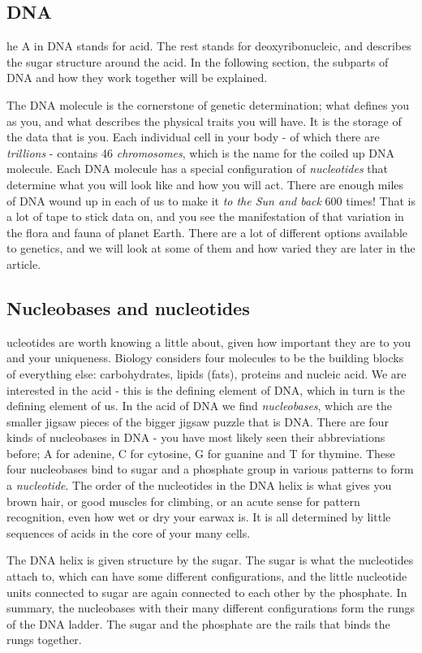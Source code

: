 \subsection*{DNA}
he A in DNA stands for acid.
The rest stands for deoxyribonucleic, and describes the sugar structure around the acid. In the following section, the subparts of DNA and how they work together will be explained. 

The DNA molecule is the cornerstone of genetic determination; what defines you as you, and what describes the physical traits you will have.
It is the storage of the data that is you.
Each individual cell in your body - of which there are \emph{trillions} - contains 46 \emph{chromosomes}, which is the name for the coiled up DNA molecule.
Each DNA molecule has a special configuration of \emph{nucleotides} that determine what you will look like and how you will act.
There are enough miles of DNA wound up in each of us to make it \emph{to the Sun and back} 600 times!
That is a lot of tape to stick data on, and you see the manifestation of that variation in the flora and fauna of planet Earth.
There are a lot of different options available to genetics, and we will look at some of them and how varied they are later in the article.

\subsection*{Nucleobases and nucleotides}
ucleotides are worth knowing a little about, given how important they are to you and your uniqueness.
Biology considers four molecules to be the building blocks of everything else: carbohydrates, lipids (fats), proteins and nucleic acid.
We are interested in the acid - this is the defining element of DNA, which in turn is the defining element of us.
In the acid of DNA we find \emph{nucleobases}, which are the smaller jigsaw pieces of the bigger jigsaw puzzle that is DNA.
There are four kinds of nucleobases in DNA - you have most likely seen their abbreviations before; A for adenine, C for cytosine, G for guanine and T for thymine.
These four nucleobases bind to sugar and a phosphate group in various patterns to form a \emph{nucleotide}.
The order of the nucleotides in the DNA helix is what gives you brown hair, or good muscles for climbing, or an acute sense for pattern recognition, even how wet or dry your earwax is.
It is all determined by little sequences of acids in the core of your many cells.

The DNA helix is given structure by the sugar.
The sugar is what the nucleotides attach to, which can have some different configurations, and the little nucleotide units connected to sugar are again connected to each other by the phosphate.
In summary, the nucleobases with their many different configurations form the rungs of the DNA ladder.
The sugar and the phosphate are the rails that binds the rungs together.

